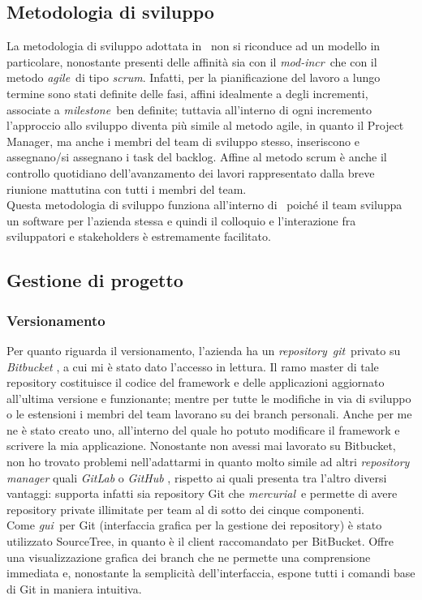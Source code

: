     \subsection{Metodologia di sviluppo}
    La metodologia di sviluppo adottata in \TS\ non si riconduce ad un modello in particolare, nonostante presenti delle affinità sia con il \emph{\gls{mod-incr}}\glsfirstoccur\ che con il metodo \emph{\gls{agile}}\glsfirstoccur\ di tipo \emph{\gls{scrum}}\glsfirstoccur. Infatti, per la pianificazione del lavoro a lungo termine sono stati definite delle fasi, affini idealmente a degli incrementi, associate a \emph{\gls{milestone}}\glsfirstoccur\ ben definite; tuttavia all'interno di ogni incremento l'approccio allo sviluppo diventa più simile al metodo agile, in quanto il Project Manager, ma anche i membri del team di sviluppo stesso,  inseriscono e assegnano/si assegnano i task del backlog. Affine al metodo scrum è anche il controllo quotidiano dell'avanzamento dei lavori rappresentato dalla breve riunione mattutina con tutti i membri del team. \\
    Questa metodologia di sviluppo funziona all'interno di \TS\ poiché il team sviluppa un software per l'azienda stessa e quindi il colloquio e l'interazione fra sviluppatori e stakeholders è estremamente facilitato.

    \subsection{Gestione di progetto}
        \subsubsection{Versionamento}
        Per quanto riguarda il versionamento, l'azienda ha un \emph{\gls{repository}}\glsfirstoccur\ \emph{\gls{git}}\glsfirstoccur\ privato su \textit{Bitbucket} \cite{site:bitbucket}, a cui mi è stato dato l'accesso in lettura. Il ramo master di tale repository costituisce il codice del framework e delle applicazioni aggiornato all'ultima versione e funzionante; mentre per tutte le modifiche in via di sviluppo o le estensioni i membri del team lavorano su dei branch personali. Anche per me ne è stato creato uno, all'interno del quale ho potuto modificare il framework e scrivere la mia applicazione. Nonostante non avessi mai lavorato su Bitbucket, non ho trovato problemi nell'adattarmi in quanto molto simile ad altri \textit{repository manager} quali \textit{GitLab} \cite{site:gitlab} o \textit{GitHub} \cite{site:github}, rispetto ai quali presenta tra l'altro diversi vantaggi: supporta infatti sia repository Git che \emph{\gls{mercurial}}\glsfirstoccur\ e permette di avere repository private illimitate per team al di sotto dei cinque componenti. \\
        Come \emph{\gls{gui}}\glsfirstoccur\ per Git (interfaccia grafica per la gestione dei repository) è stato utilizzato SourceTree, in quanto è il client raccomandato per BitBucket. Offre una visualizzazione grafica dei branch che ne permette una comprensione immediata e, nonostante la semplicità dell'interfaccia, espone tutti i comandi base di Git in maniera intuitiva.
        
